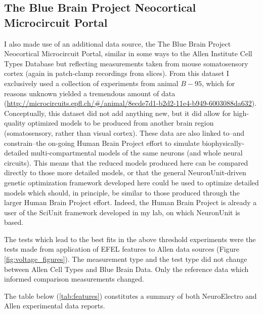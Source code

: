 \subsection{The Blue Brain Project Neocortical Microcircuit Portal}
\label{sec:bluebrain-data}
I also made use of an additional data source, the The Blue Brain Project Neocortical Microcircuit Portal, similar in some ways to the Allen Institute Cell Types Database but reflecting measurements taken from mouse somatosensory cortex (again in patch-clamp recordings from slices).
From this dataset I exclusively used a collection of experiments from animal $B-95$, which for reasons unknown yielded a tremendous amount of data (\url{http://microcircuits.epfl.ch/#/animal/8ecde7d1-b2d2-11e4-b949-6003088da632}).
Conceptually, this dataset did not add anything new, but it did allow for high-quality optimized models to be produced from another brain region (somatosensory, rather than visual cortex).
These data are also linked to--and constrain--the on-going Human Brain Project effort to simulate biophysically-detailed multi-compartmental models of the same neurons (and whole neural circuits).
This means that the reduced models produced here can be compared directly to those more detailed models, or that the general NeuronUnit-driven genetic optimization framework developed here could be used to optimize detailed models which should, in principle, be similar to those produced through the larger Human Brain Project effort.
Indeed, the Human Brain Project is already a user of the SciUnit framework developed in my lab, on which NeuronUnit is based.

The tests which lead to the best fits in the above threshold experiments were the tests made from application of EFEL features to Allen data sources (Figure \ref{fig:voltage_figures}). The measurement type and the test type did not change between Allen Cell Types and Blue Brain Data. Only the reference data which informed comparison measurements changed. %

The table below (\ref{tab:features}) constitutes a summary of both NeuroElectro and Allen experimental data reports. %

